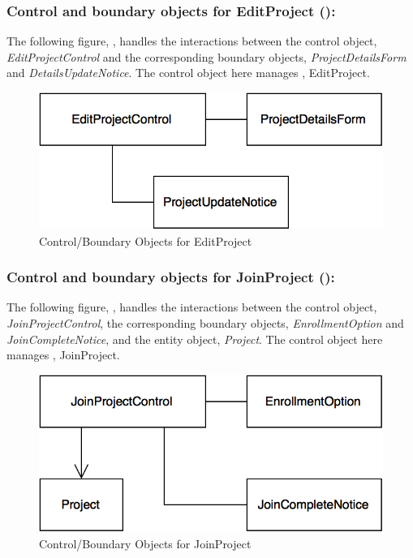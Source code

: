\documentclass[12pt,letterpaper]{article}
\begin{document}
\subsubsection*{Control and boundary objects for EditProject ():}

The following figure, , handles the interactions between the control object, {\it EditProjectControl} and the corresponding boundary objects, 
{\it ProjectDetailsForm} and {\it DetailsUpdateNotice}. The control object here manages , EditProject.

\begin{figure}[H]
	\centering{}
	\includegraphics[scale=0.37]{imgs/cbod/edit-project.png}
	\caption{Control/Boundary Objects for EditProject}
\end{figure}

\subsubsection*{Control and boundary objects for JoinProject ():}

The following figure, , handles the interactions between the control object, {\it JoinProjectControl}, the corresponding boundary objects, 
{\it EnrollmentOption} and {\it JoinCompleteNotice}, and the entity object, {\it Project}. The control object here manages , JoinProject.

\begin{figure}[H]
	\centering{}
	\includegraphics[scale=0.37]{imgs/cbod/join-project.png}
	\caption{Control/Boundary Objects for JoinProject}
\end{figure}
\end{document}
